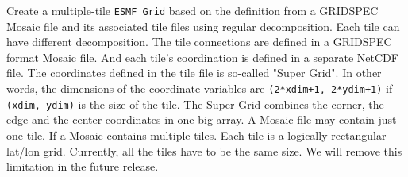      Create a multiple-tile {\tt ESMF\_Grid} based on the definition from a GRIDSPEC Mosaic file and its associated
     tile files using regular decomposition.  Each tile can have different decomposition.  The tile connections
     are defined in a GRIDSPEC format Mosaic file.
     And each tile's coordination is defined in a separate NetCDF file.  The coordinates defined
     in the tile file is so-called "Super Grid".  In other words, the dimensions of the coordinate variables are
     {\tt (2*xdim+1, 2*ydim+1)} if {\tt (xdim, ydim)} is the size of the tile.  The Super Grid combines the corner,
     the edge and the center coordinates in one big array.  A Mosaic file may contain just one tile.  If a Mosaic contains
     multiple tiles.  Each tile is a logically rectangular lat/lon grid.  Currently, all the tiles have to be the same size.
     We will remove this limitation in the future release.
  
